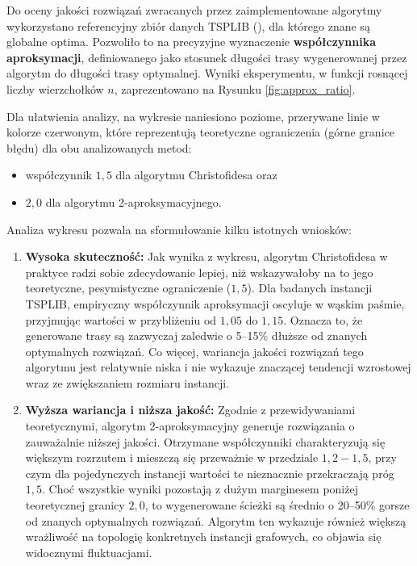 \documentclass{article}
\theoremstyle{definition}
\theoremstyle{plain}
\theoremstyle{remark}
\begin{document}
Do oceny jakości rozwiązań zwracanych przez zaimplementowane algorytmy wykorzystano referencyjny zbiór danych TSPLIB (), dla którego znane są globalne optima. Pozwoliło to na precyzyjne wyznaczenie \textbf{współczynnika aproksymacji}, definiowanego jako stosunek długości trasy wygenerowanej przez algorytm do długości trasy optymalnej. Wyniki eksperymentu, w funkcji rosnącej liczby wierzchołków $n$, zaprezentowano na Rysunku \ref{fig:approx_ratio}.

Dla ułatwienia analizy, na wykresie naniesiono poziome, przerywane linie w kolorze czerwonym, które reprezentują teoretyczne ograniczenia (górne granice błędu) dla obu analizowanych metod: 

\begin{itemize}
    \item współczynnik $1{,}5$ dla algorytmu Christofidesa oraz
    \item $2{,}0$ dla algorytmu 2-aproksymacyjnego.
\end{itemize}

\noindent
Analiza wykresu pozwala na sformułowanie kilku istotnych wniosków:

\begin{enumerate}
    \item \textbf{Wysoka skuteczność:} Jak wynika z wykresu, algorytm Christofidesa w praktyce radzi sobie zdecydowanie lepiej, niż wskazywałoby na to jego teoretyczne, pesymistyczne ograniczenie ($1{,}5$). Dla badanych instancji TSPLIB, empiryczny współczynnik aproksymacji oscyluje w wąskim paśmie, przyjmując wartości w przybliżeniu od $1{,}05$ do $1{,}15$. Oznacza to, że generowane trasy są zazwyczaj zaledwie o 5--15\% dłuższe od znanych optymalnych rozwiązań. Co więcej, wariancja jakości rozwiązań tego algorytmu jest relatywnie niska i nie wykazuje znaczącej tendencji wzrostowej wraz ze zwiększaniem rozmiaru instancji.
    
    \item \textbf{Wyższa wariancja i niższa jakość:} Zgodnie z przewidywaniami teoretycznymi, algorytm 2-aproksymacyjny generuje rozwiązania o zauważalnie niższej jakości. Otrzymane współczynniki charakteryzują się większym rozrzutem i mieszczą się przeważnie w przedziale $1{,}2 - 1{,}5$, przy czym dla pojedynczych instancji wartości te nieznacznie przekraczają próg $1{,}5$. Choć wszystkie wyniki pozostają z dużym marginesem poniżej teoretycznej granicy $2{,}0$, to wygenerowane ścieżki są średnio o 20--50\% gorsze od znanych optymalnych rozwiązań. Algorytm ten wykazuje również większą wrażliwość na topologię konkretnych instancji grafowych, co objawia się widocznymi fluktuacjami.
\end{enumerate}
\end{document}

